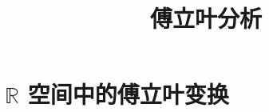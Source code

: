 \documentclass{book}
\begin{document}
\title{傅立叶分析}
\maketitle

\chapter{$\mathbb R$ 空间中的傅立叶变换}


\cite{stein2003}


\end{document}
